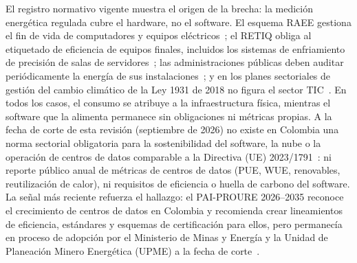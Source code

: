 \documentclass[conference]{IEEEtran}
\begin{document}
El registro normativo vigente muestra el origen de la brecha: la medici\'on energ\'etica regulada cubre el hardware, no el software. El esquema {RAEE} gestiona el fin de vida de computadores y equipos el\'ectricos~\cite{raeeRes0851}; el {RETIQ} obliga al etiquetado de eficiencia de equipos finales, incluidos los sistemas de enfriamiento de precisi\'on de salas de servidores~\cite{retiq2015}; las administraciones p\'ublicas deben auditar peri\'odicamente la energ\'ia de sus instalaciones~\cite{ley2407energia}; y en los planes sectoriales de gesti\'on del cambio clim\'atico de la Ley 1931 de 2018 no figura el sector {TIC}~\cite{ley1931clima}. En todos los casos, el consumo se atribuye a la infraestructura f\'isica, mientras el software que la alimenta permanece sin obligaciones ni m\'etricas propias. A la fecha de corte de esta revisi\'on (septiembre de 2026) no existe en Colombia una norma sectorial obligatoria para la sostenibilidad del software, la nube o la operaci\'on de centros de datos comparable a la Directiva ({UE}) 2023/1791~\cite{eu2023dir1791}: ni reporte p\'ublico anual de m\'etricas de centros de datos ({PUE}, {WUE}, renovables, reutilizaci\'on de calor), ni requisitos de eficiencia o huella de carbono del software. La señal m\'as reciente refuerza el hallazgo: el {PAI-PROURE} 2026--2035 reconoce el crecimiento de centros de datos en Colombia y recomienda crear lineamientos de eficiencia, est\'andares y esquemas de certificaci\'on para ellos, pero permanec\'ia en proceso de adopci\'on por el Ministerio de Minas y Energ\'ia y la Unidad de Planeaci\'on Minero Energ\'etica (UPME) a la fecha de corte~\cite{prourePai2026,circularUpme075}.
\end{document}
